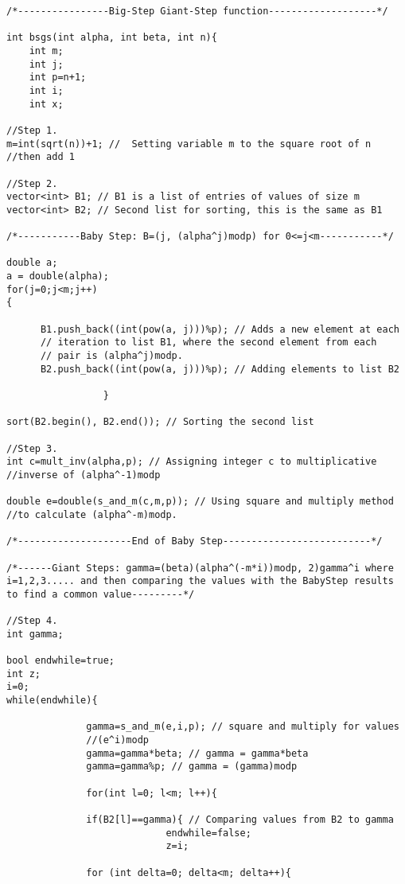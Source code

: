 \documentclass[iwp,first]{luthesis}
\begin{document}
\begin{verbatim}
/*----------------Big-Step Giant-Step function-------------------*/

int bsgs(int alpha, int beta, int n){ 
    int m;
    int j;
    int p=n+1; 
    int i;
    int x;
    
//Step 1.
m=int(sqrt(n))+1; //  Setting variable m to the square root of n 
//then add 1

//Step 2.
vector<int> B1; // B1 is a list of entries of values of size m
vector<int> B2; // Second list for sorting, this is the same as B1

/*-----------Baby Step: B=(j, (alpha^j)modp) for 0<=j<m-----------*/

double a;
a = double(alpha);
for(j=0;j<m;j++)
{				
			
      B1.push_back((int(pow(a, j)))%p); // Adds a new element at each
      // iteration to list B1, where the second element from each 
      // pair is (alpha^j)modp. 
      B2.push_back((int(pow(a, j)))%p); // Adding elements to list B2
              
                 }

sort(B2.begin(), B2.end()); // Sorting the second list 

//Step 3.
int c=mult_inv(alpha,p); // Assigning integer c to multiplicative 
//inverse of (alpha^-1)modp

double e=double(s_and_m(c,m,p)); // Using square and multiply method
//to calculate (alpha^-m)modp.

/*--------------------End of Baby Step--------------------------*/

/*------Giant Steps: gamma=(beta)(alpha^(-m*i))modp, 2)gamma^i where 
i=1,2,3..... and then comparing the values with the BabyStep results 
to find a common value---------*/ 

//Step 4.
int gamma;

bool endwhile=true; 
int z;
i=0;
while(endwhile){
              
              gamma=s_and_m(e,i,p); // square and multiply for values 
              //(e^i)modp
              gamma=gamma*beta; // gamma = gamma*beta
              gamma=gamma%p; // gamma = (gamma)modp
              
              for(int l=0; l<m; l++){
                      
              if(B2[l]==gamma){ // Comparing values from B2 to gamma
                            endwhile=false; 
                            z=i; 
                            
              for (int delta=0; delta<m; delta++){
                  

\end{verbatim}
\end{document}
